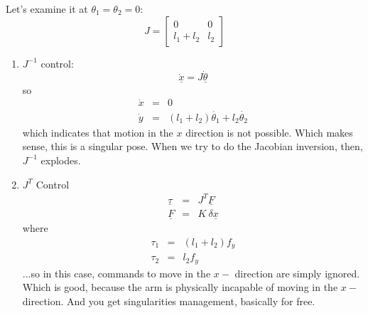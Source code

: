 \documentclass[]{article}
\begin{document}
Let's examine it at $\theta_{1} = \theta_{2} = 0$:
\begin{displaymath}
 J = \left[\begin{array}{cc} 0 & 0 \\ l_{1}+l_{2} & l_{2} \end{array} \right]
\end{displaymath}
\begin{enumerate}
 \item $J^{-1}$ control:
 \begin{displaymath}
  \underline{\dot{x}} = J\underline{\dot{\theta}}
 \end{displaymath}
so
\begin{eqnarray}
 \dot{x} & = & 0 \nonumber \\
 \dot{y} & = & (l_{1}+l_{2})\dot{\theta_{1}} + l_{2}\dot{\theta_{2}} \nonumber
\end{eqnarray}
which indicates that motion in the $x$ direction is not possible. Which makes sense, this is a singular pose. When we try to do the Jacobian inversion, then, $J^{-1}$ explodes.
\item $J^{T}$ Control
\begin{eqnarray}
 \underline{\tau} & = & J^{T}\underline{F} \nonumber \\
 \underline{F} & = & K\ \delta\underline{x} \nonumber
\end{eqnarray}
where
\begin{eqnarray}
 \tau_{1} & = & (l_{1}+l_{2})f_{y} \nonumber \\
 \tau_{2} & = & l_{2}f_{y} \nonumber
\end{eqnarray}
...so in this case, commands to move in the $x-$ direction are simply ignored. Which is good, because the arm is physically incapable of moving in the $x-$direction. And you get singularities management, basically for free.
\end{enumerate}
\end{document}
